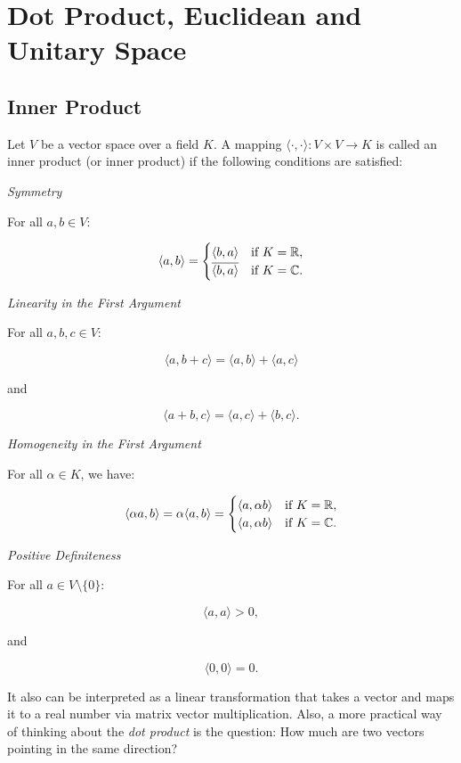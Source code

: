 \newpage
\section{Dot Product, Euclidean and Unitary Space}

\subsection{Inner Product}

Let \(V\) be a vector space over a field \(K\). A mapping \(\langle \cdot, \cdot \rangle : V \times V 
\to K\) is called an inner product (or inner product) if the following conditions are satisfied:

\emph{Symmetry}

For all \(a, b \in V\):

\[
    \langle a, b \rangle = 
    \begin{cases}
    \langle b, a \rangle & \text{if } K = \mathbb{R}, \\
    \overline{\langle b, a \rangle} & \text{if } K = \mathbb{C}.
    \end{cases}
\]

\emph{Linearity in the First Argument}

For all \(a, b, c \in V\):

\[
    \langle a, b + c \rangle = \langle a, b \rangle + \langle a, c \rangle
\]

and

\[
    \langle a + b, c \rangle = \langle a, c \rangle + \langle b, c \rangle.
\]

\emph{Homogeneity in the First Argument}

For all \(\alpha \in K\), we have:

\[
    \langle \alpha a, b \rangle = \alpha \langle a, b \rangle = 
    \begin{cases}
    \langle a, \alpha b \rangle & \text{if } K = \mathbb{R}, \\
    \langle a, \alpha b \rangle & \text{if } K = \mathbb{C}.
    \end{cases}
\]

\emph{Positive Definiteness}

For all \(a \in V \setminus \{0\}\):

\[
    \langle a, a \rangle > 0,
\]

and

\[
    \langle 0, 0 \rangle = 0.
\]

It also can be interpreted as a linear transformation that takes a vector and maps it to a real number
 via matrix vector multiplication. Also, a more practical way of thinking about the 
 \emph{dot product} is the question: How much are two vectors pointing in the same direction?

